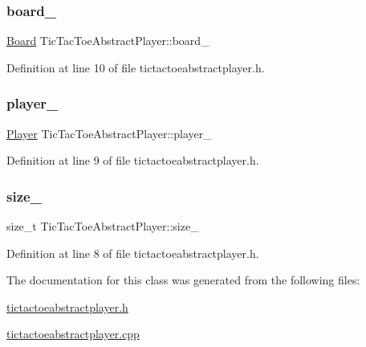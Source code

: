 \subsubsection{\texorpdfstring{board\+\_\+}{board\_}}
{\footnotesize\ttfamily \hyperlink{common__defs_8h_a0dc5e1c0d1c3d4b1e210c805de5ca27b}{Board} Tic\+Tac\+Toe\+Abstract\+Player\+::board\+\_\+\hspace{0.3cm}{\ttfamily [protected]}}



Definition at line 10 of file tictactoeabstractplayer.\+h.

\mbox{\label{class_tic_tac_toe_abstract_player_ace1857b73ea4e55c4ce6c00a3dcf12ec}} 
\subsubsection{\texorpdfstring{player\+\_\+}{player\_}}
{\footnotesize\ttfamily \hyperlink{common__defs_8h_a9c8780378078e51e7c9041cbac392db9}{Player} Tic\+Tac\+Toe\+Abstract\+Player\+::player\+\_\+\hspace{0.3cm}{\ttfamily [protected]}}



Definition at line 9 of file tictactoeabstractplayer.\+h.

\mbox{\label{class_tic_tac_toe_abstract_player_a59c4f8555c74ce83ebabefc8199435e2}} 
\subsubsection{\texorpdfstring{size\+\_\+}{size\_}}
{\footnotesize\ttfamily size\+\_\+t Tic\+Tac\+Toe\+Abstract\+Player\+::size\+\_\+\hspace{0.3cm}{\ttfamily [protected]}}



Definition at line 8 of file tictactoeabstractplayer.\+h.



The documentation for this class was generated from the following files\+:\begin{DoxyCompactItemize}
\item 
\hyperlink{tictactoeabstractplayer_8h}{tictactoeabstractplayer.\+h}\item 
\hyperlink{tictactoeabstractplayer_8cpp}{tictactoeabstractplayer.\+cpp}\end{DoxyCompactItemize}
